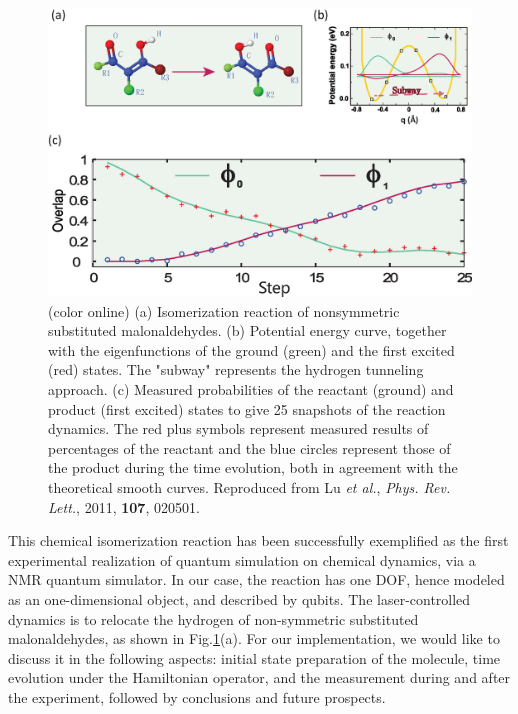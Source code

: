 \documentclass[8.5pt,twoside,twocolumn]{article}
\begin{document}
\begin{figure}[htb]
\begin{center}
\includegraphics[width= 0.95\columnwidth]{fig4.eps}
\end{center}
\caption{(color online) (a) Isomerization reaction of nonsymmetric substituted malonaldehydes.
(b) Potential energy curve, together with the eigenfunctions of
    the ground (green) and the first excited (red) states.
    The "subway" represents the hydrogen tunneling approach.
(c) Measured probabilities of the reactant (ground) and product (first excited) states
    to give 25 snapshots of the reaction dynamics.
    The red plus symbols represent measured results of
    percentages of the reactant and the blue circles
    represent those of the product
    during the time evolution, both in agreement with
    the theoretical smooth curves. Reproduced from Lu \emph{et al.}, \emph{Phys. Rev. Lett.}, 2011, \textbf{107}, 020501.\cite{NMR_dynamic}}\label{fig4}
\end{figure}

This chemical isomerization reaction has been successfully exemplified
as the first experimental realization of
quantum simulation on chemical dynamics,
via a NMR quantum simulator.\cite{NMR_dynamic}
In our case, the reaction has one DOF, hence modeled
as an one-dimensional object, and described by qubits.
The laser-controlled dynamics is to relocate the hydrogen
of non-symmetric substituted malonaldehydes,\cite{Hydrogen-Subway}
as shown in Fig.\ref{fig4}(a).
For our implementation, we would like to discuss it in the following aspects:
initial state preparation of the molecule,
time evolution under the Hamiltonian operator,
and the measurement during and after the experiment,
followed by conclusions and future prospects.
\end{document}
